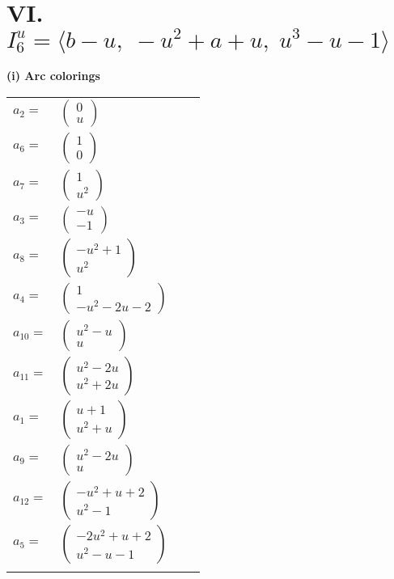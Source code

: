 \documentclass[1p]{elsarticle_modified}
\theoremstyle{definition}
\begin{document}
\centering \section*{VI. $I^u_{6}= \langle b- u,\;- u^2+a+u,\;u^3- u-1 \rangle$}
\flushleft \textbf{(i) Arc colorings}\\
\begin{tabular}{m{7pt} m{180pt} m{7pt} m{180pt} }
\flushright $a_{2}=$&$\begin{pmatrix}0\\u\end{pmatrix}$ \\
\flushright $a_{6}=$&$\begin{pmatrix}1\\0\end{pmatrix}$ \\
\flushright $a_{7}=$&$\begin{pmatrix}1\\u^2\end{pmatrix}$ \\
\flushright $a_{3}=$&$\begin{pmatrix}- u\\-1\end{pmatrix}$ \\
\flushright $a_{8}=$&$\begin{pmatrix}- u^2+1\\u^2\end{pmatrix}$ \\
\flushright $a_{4}=$&$\begin{pmatrix}1\\- u^2-2 u-2\end{pmatrix}$ \\
\flushright $a_{10}=$&$\begin{pmatrix}u^2- u\\u\end{pmatrix}$ \\
\flushright $a_{11}=$&$\begin{pmatrix}u^2-2 u\\u^2+2 u\end{pmatrix}$ \\
\flushright $a_{1}=$&$\begin{pmatrix}u+1\\u^2+u\end{pmatrix}$ \\
\flushright $a_{9}=$&$\begin{pmatrix}u^2-2 u\\u\end{pmatrix}$ \\
\flushright $a_{12}=$&$\begin{pmatrix}- u^2+u+2\\u^2-1\end{pmatrix}$ \\
\flushright $a_{5}=$&$\begin{pmatrix}-2 u^2+u+2\\u^2- u-1\end{pmatrix}$\\&\end{tabular}
\end{document}
